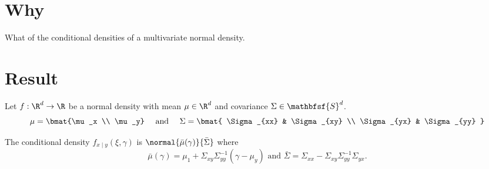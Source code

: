 

\section*{Why}

What of the conditional densities of a multivariate normal density.

\section*{Result}

\begin{proposition}
Let $f: \R ^d \to \R $ be a normal density with mean $\mu \in \R ^d$ and covariance $\Sigma  \in \mathbfsf{S} ^d$.
\[
\mu  = \bmat{\mu _x \\ \mu _y} \quad \text{ and } \quad
\Sigma  = \bmat{
\Sigma _{xx} & \Sigma _{xy} \\
\Sigma _{yx} & \Sigma _{yy}
}
\]

The conditional density $f_{x \mid y}(\xi , \gamma )$ is $\normal{\bar{\mu }(\gamma )}{\bar{\Sigma }}$ where
\[
\bar{\mu }(\gamma ) = \mu _1 + \Sigma _{xy}\Sigma _{yy}^{-1}(\gamma - \mu _y) \text{ and } \bar{\Sigma } = \Sigma _{xx} - \Sigma _{xy}\Sigma _{yy}^{-1}\Sigma _{yx}.
\]

\end{proposition}

\blankpage